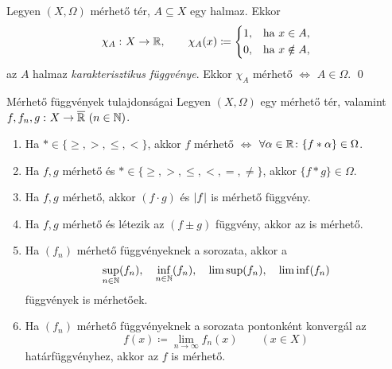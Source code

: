\documentclass[
]{elteikthesis}[2024/04/26]
\begin{document}
	\begin{example}
		Legyen \( (X, \Omega) \) mérhető tér, \( A \subseteq X \) egy halmaz. Ekkor
		\[
			\chi_A \,\colon X \to \mathbb{R}, \qquad
			\chi_A(x) \coloneq 
			\left\{
			\begin{aligned}
				1, & \quad \text{ha } x \in A, \\
				0, & \quad \text{ha } x \notin A, \\
			\end{aligned}
			\right.
		\]
		az \( A \) halmaz \emph{karakterisztikus függvénye}.
		Ekkor \( \chi_A \) mérhető \( \iff \) \( A \in \Omega \). \qed
	\end{example}
	
	\begin{theorem}{Mérhető függvények tulajdonságai}{}
		Legyen \( (X, \Omega) \) egy mérhető tér, 
		valamint \( f, f_n, g \,\colon X \to \overline{\mathbb{R}} \ (n \in \mathbb{N}) \).
		\begin{enumerate}
			\item 
			Ha \( * \in \{ \geq, >, \leq, < \} \),
			akkor \( f \) mérhető \( \iff \) 
			\( \forall \alpha \in \mathbb{R} \colon \{ f * \alpha \} \in \Omega \).
			
			\item
			Ha \( f, g \) mérhető és \( * \in \{ \geq, >, \leq, <, =, \neq \} \), 
			akkor \( \{ f * g \} \in \Omega \).
			
			\item
			Ha \( f, g \) mérhető, akkor \( (f \cdot g) \) és \( \abs{f} \) is mérhető függvény.
			
			\item
			Ha \( f, g \) mérhető és létezik az \( (f \pm g) \) függvény, akkor az is mérhető.
			
			\item
			Ha \( (f_n) \) mérhető függvényeknek a sorozata, akkor a
			\[
				\sup_{n \in \mathbb{N}}(f_n), \quad
				\inf_{n \in \mathbb{N}}(f_n), \quad
				\limsup(f_n), \quad
				\liminf(f_n)
			\]
			függvények is mérhetőek.
			
			\item
			Ha \( (f_n) \) mérhető függvényeknek a sorozata pontonként konvergál az
			\[
				f(x) \coloneq \lim_{n \to \infty} f_n(x) \qquad (x \in X)
			\]
			határfüggvényhez, akkor az \( f \) is mérhető.
		\end{enumerate}
	\end{theorem}
	
\end{document}
